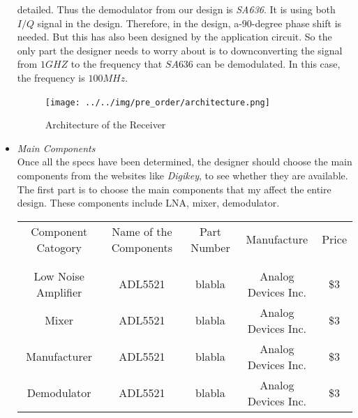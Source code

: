 \documentclass[]{article}
\begin{document}
\begin{itemize}
            detailed. Thus the demodulator from our design is \textit{SA636}. It
            is using both $I/Q$ signal in the design. Therefore, in the design,
            a-$90$-degree phase shift is needed. But this has also been designed
            by the application circuit. So the only part the designer needs to
            worry about is to downconverting the signal from $1GHZ$ to the
            frequency that $SA636$ can be demodulated. In this case, the
            frequency is $100MHz$.
            \begin{figure}[p]
                \begin{center}
                    \texttt{[image: ../../img/pre\_order/architecture.png]}~
                    \label{architecture}
                    \caption{Architecture of the Receiver}
                \end{center}
            \end{figure}
        \item \textit{Main Components} \\
            Once all the specs have been determined, the designer should choose
            the main components from the websites like \textit{Digikey}, to see
            whether they are available. The first part is to choose the main
            components that my affect the entire design. These components
            include LNA, mixer, demodulator.

            \begin{center}
                \begin{tabular}{c c c c c}
                    Component Catogory & Name of the Components & Part Number &
                    Manufacture & Price \\ \\ \hline \\
                    Low Noise Amplifier & ADL5521 & blabla & Analog Devices Inc.
                    & \$3 \\
                    Mixer & ADL5521 & blabla & Analog Devices Inc. & \$3 \\
                    Manufacturer & ADL5521 & blabla & Analog Devices Inc. & \$3
                    \\
                    Demodulator & ADL5521 & blabla & Analog Devices Inc. & \$3
                    \\
                \end{tabular}
            \end{center}


\end{itemize}
\end{document}
